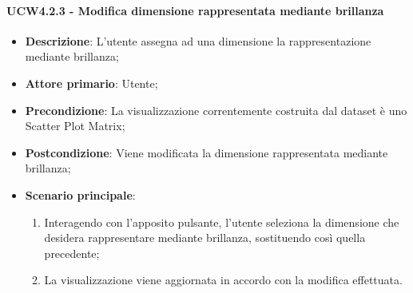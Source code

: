 \paragraph{UCW4.2.3 - Modifica dimensione rappresentata mediante brillanza}
\label{par:ucw4.2.3}
\begin{itemize}

    \item \textbf{Descrizione}:     L'utente assegna ad una dimensione la rappresentazione mediante brillanza;
    \item \textbf{Attore primario}: Utente;
    \item \textbf{Precondizione}:   La visualizzazione correntemente costruita dal dataset è uno Scatter Plot Matrix;
    \item \textbf{Postcondizione}:  Viene modificata la dimensione rappresentata mediante brillanza;
    \item \textbf{Scenario principale}:
    \begin{enumerate}
        \item   Interagendo con l'apposito pulsante, l'utente seleziona la dimensione che desidera rappresentare
                mediante brillanza, sostituendo così quella precedente;

        \item   La visualizzazione viene aggiornata in accordo con la modifica effettuata.
    \end{enumerate}
\end{itemize}

